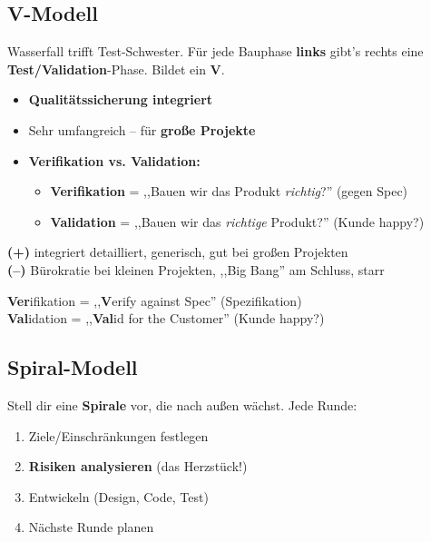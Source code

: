 \documentclass[11pt,a4paper]{article}
\begin{document}
\subsection{V-Modell}

\begin{story}
Wasserfall trifft Test-Schwester. Für jede Bauphase \textbf{links} gibt's rechts eine \textbf{Test/Validation}-Phase. Bildet ein \textbf{V}.
\end{story}

\begin{keyfacts}
\begin{itemize}
  \item \textbf{Qualitätssicherung integriert}
  \item Sehr umfangreich -- für \textbf{große Projekte}
  \item \textbf{Verifikation vs. Validation:}
  \begin{itemize}
    \item \textbf{Verifikation} = ,,Bauen wir das Produkt \emph{richtig}?'' (gegen Spec)
    \item \textbf{Validation} = ,,Bauen wir das \emph{richtige} Produkt?'' (Kunde happy?)
  \end{itemize}
\end{itemize}
\textbf{(+)} integriert detailliert, generisch, gut bei großen Projekten\\
\textbf{(--)} Bürokratie bei kleinen Projekten, ,,Big Bang'' am Schluss, starr
\end{keyfacts}

\begin{merkhilfe}
\textbf{Ver}ifikation = ,,\textbf{V}erify against Spec'' (Spezifikation)\\
\textbf{Val}idation = ,,\textbf{Val}id for the Customer'' (Kunde happy?)
\end{merkhilfe}

\subsection{Spiral-Modell}

\begin{story}
Stell dir eine \textbf{Spirale} vor, die nach außen wächst. Jede Runde:
\begin{enumerate}
  \item Ziele/Einschränkungen festlegen
  \item \textbf{Risiken analysieren} (das Herzstück!)
  \item Entwickeln (Design, Code, Test)
  \item Nächste Runde planen
\end{enumerate}
\end{story}
\end{document}
